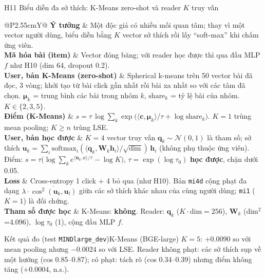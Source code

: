 \documentclass[aspectratio=169,t]{beamer}
\makeatletter
\newcommand{\code}[1]{\texttt{#1}}
\newcommand{\bangmota}[1]{{\scriptsize\renewcommand{\arraystretch}{1.1}\setlength{\tabcolsep}{4pt}%
  \begin{tabularx}{\textwidth}{@{}P{2.55cm}Y@{}}\toprule #1 \bottomrule\end{tabularx}}}
\newcommand{\rw}[2]{\textbf{#1} & #2\\ \midrule}
\newcommand{\rwl}[2]{\textbf{#1} & #2\\}
\newcommand{\ketqua}[1]{\begin{exampleblock}{Kết quả đo (test \code{MINDlarge\_dev})}\scriptsize #1\end{exampleblock}}
\makeatother
\begin{document}
\begin{frame}[shrink]{H11 \textperiodcentered{} Biểu diễn đa sở thích: K-Means zero-shot và reader $K$ truy vấn}
\bangmota{
\rw{Ý tưởng}{Một độc giả có nhiều mối quan tâm; thay vì một vector người dùng, biểu diễn bằng $K$ vector sở thích rồi lấy ``soft-max'' khi chấm ứng viên.}
\rw{Mã hóa bài (item)}{Vector đóng băng; với reader học được thì qua đầu MLP $f$ như H10 (dim 64, dropout 0.2).}
\rw{User, bản K-Means (zero-shot)}{Spherical k-means trên 50 vector bài đã đọc, 3 vòng; khởi tạo từ bài click gần nhất rồi bài xa nhất so với các tâm đã chọn. $\boldsymbol\mu_k$ = trung bình các bài trong nhóm $k$, $\text{share}_k$ = tỷ lệ bài của nhóm. $K\in\{2,3,5\}$.}
\rw{Điểm (K-Means)}{$s=\tau\,\log\sum_k\exp\!\big(\langle\mathbf c,\boldsymbol\mu_k\rangle/\tau+\log\text{share}_k\big)$. $K=1$ trùng mean pooling; $K\ge n$ trùng LSE.}
\rw{User, bản học được}{$K=4$ vector truy vấn $\mathbf q_k\sim\mathcal N(0,1)$ là tham số; sở thích $\mathbf u_k=\sum_i\mathrm{softmax}_i(\langle\mathbf q_k,\mathbf W_k\mathbf h_i\rangle/\sqrt{\text{dim}})\,\mathbf h_i$ (không phụ thuộc ứng viên). Điểm: $s=\tau\big(\log\sum_k e^{\langle\mathbf u_k,\mathbf c\rangle/\tau}-\log K\big)$, $\tau=\exp(\log\tau_0)$ \textbf{học được}, chặn dưới 0.05.}
\rw{Loss}{Cross-entropy 1 click + 4 bỏ qua (như H10). Bản \code{mi4d} cộng phạt đa dạng $\lambda\cdot\overline{\cos^2(\mathbf u_k,\mathbf u_l)}$ giữa các sở thích khác nhau của cùng người dùng; \code{mi1} ($K=1$) là đối chứng.}
\rwl{Tham số được học}{K-Means: \textbf{không}. Reader: $\mathbf q_k$ ($K\cdot\text{dim}=256$), $\mathbf W_k$ (dim$^2$=4.096), $\log\tau_0$ (1), cộng đầu MLP $f$.}
}
\ketqua{K-Means (BGE-large) $K=5$: $+0.0090$ so với mean pooling nhưng $-0.0024$ so với LSE. Reader không phạt: các sở thích sụp về một hướng (cos 0.85--0.87); có phạt: tách rõ (cos 0.34--0.39) nhưng điểm không tăng ($+0.0004$, n.s.).}
\par\kern0pt
\end{frame}
\end{document}
